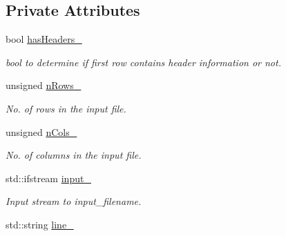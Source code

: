 \subsection*{Private Attributes}
\begin{DoxyCompactItemize}
\item 
\hypertarget{classCsvParser_abd8b856c78fe3ce8b32f1e6b0a390c84}{bool \hyperlink{classCsvParser_abd8b856c78fe3ce8b32f1e6b0a390c84}{has\-Headers\-\_\-}}\label{classCsvParser_abd8b856c78fe3ce8b32f1e6b0a390c84}

\begin{DoxyCompactList}\small\item\em bool to determine if first row contains header information or not. \end{DoxyCompactList}\item 
\hypertarget{classCsvParser_a646e6783ca009681d11cdd80148c50c2}{unsigned \hyperlink{classCsvParser_a646e6783ca009681d11cdd80148c50c2}{n\-Rows\-\_\-}}\label{classCsvParser_a646e6783ca009681d11cdd80148c50c2}

\begin{DoxyCompactList}\small\item\em No. of rows in the input file. \end{DoxyCompactList}\item 
\hypertarget{classCsvParser_ab12394b6deff7073d7182fc5a1b3d942}{unsigned \hyperlink{classCsvParser_ab12394b6deff7073d7182fc5a1b3d942}{n\-Cols\-\_\-}}\label{classCsvParser_ab12394b6deff7073d7182fc5a1b3d942}

\begin{DoxyCompactList}\small\item\em No. of columns in the input file. \end{DoxyCompactList}\item 
\hypertarget{classCsvParser_a418665bb33ded4f1ce88bedb60e3ffc0}{std\-::ifstream \hyperlink{classCsvParser_a418665bb33ded4f1ce88bedb60e3ffc0}{input\-\_\-}}\label{classCsvParser_a418665bb33ded4f1ce88bedb60e3ffc0}

\begin{DoxyCompactList}\small\item\em Input stream to {\itshape input\-\_\-filename}. \end{DoxyCompactList}\item 
\hypertarget{classCsvParser_aaeb353f8e1c649830268cfa5635eaa4f}{std\-::string \hyperlink{classCsvParser_aaeb353f8e1c649830268cfa5635eaa4f}{line\-\_\-}}\label{classCsvParser_aaeb353f8e1c649830268cfa5635eaa4f}


\end{DoxyCompactItemize}
